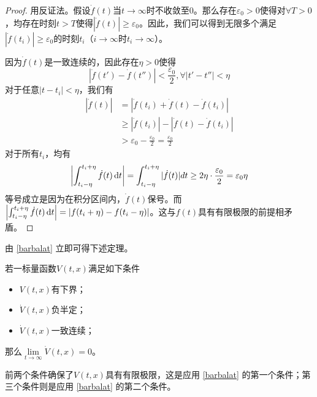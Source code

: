 \begin{proof}
  用反证法。假设$\dot{f}(t)$当$t\to\infty$时不收敛至$0$。那么存在$\varepsilon_0>0$使得对$\forall T>0$，均存在时刻$t>T$使得$|\dot{f}(t)|\ge \varepsilon_0$。因此，我们可以得到无限多个满足$|\dot{f}(t_i)|\ge \varepsilon_0$的时刻$t_i$（$i\to\infty$时$t_i\to\infty$）。

  因为$\dot{f}(t)$是一致连续的，因此存在$\eta>0$使得
  \[|\dot{f}(t')-\dot{f}(t'')|<\frac{\varepsilon_0}{2},\forall |t'-t''|<\eta\]
  对于任意$|t-t_i|<\eta$，我们有
  \begin{align*}
    |\dot{f}(t)|&= |\dot{f}(t_i)+\dot{f}(t)-\dot{f}(t_i)|\\
    &\ge |\dot{f}(t_i)|- |\dot{f}(t)-\dot{f}(t_i)|\\
    &>\varepsilon_0-\frac{\varepsilon_0}{2}=\frac{\varepsilon_0}{2}
  \end{align*}
  对于所有$t_i$，均有
  \[\left|\int_{t_i-\eta}^{t_i+\eta}\dot{f}(t)\mathop{}\!\mathrm{d} t\right|=\int_{t_i-\eta}^{t_i+\eta}|\dot{f}(t)|dt\geq2\eta\cdot\frac{\varepsilon_{0}}{2}=\varepsilon_{0}\eta\]
  等号成立是因为在积分区间内，$\dot{f}(t)$保号。而$\left|\int_{t_i-\eta}^{t_i+\eta}\dot{f}(t)\mathop{}\!\mathrm{d} t\right|=|f(t_i+\eta)-f(t_i-\eta)|$。这与$f(t)$具有有限极限的前提相矛盾。
\end{proof}
由 \ref{barbalat} 立即可得下述定理。
\begin{theorem}\label{Lyapunov-like}
    若一标量函数$V(t,x)$满足如下条件
    \begin{itemize}[leftmargin=1em]
      \item $V(t,x)$有下界；
      \item $\dot{V}(t,x)$负半定；
      \item $\dot{V}(t,x)$一致连续；
    \end{itemize}
    那么$\lim\limits_{t\to\infty}\dot{V}(t,x)=0$。
\end{theorem}
\begin{note}
  前两个条件确保了$V(t,x)$具有有限极限，这是应用 \ref{barbalat} 的第一个条件；第三个条件则是应用 \ref{barbalat} 的第二个条件。
\end{note}
